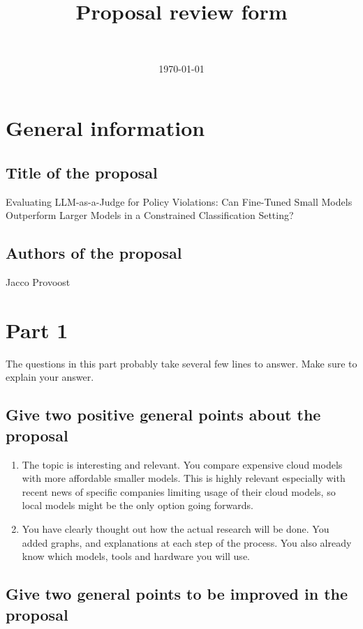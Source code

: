 \documentclass{article}
\title{Proposal review form }
\author{~} %
\date{\today}
\begin{document}
\maketitle

\section*{General information}


\subsection*{Title of the proposal}

Evaluating LLM-as-a-Judge for Policy Violations: Can Fine-Tuned Small Models Outperform Larger Models in a Constrained Classification Setting?

\subsection*{Authors of the proposal}

Jacco Provoost

\section{Part 1}

The questions in this part probably take several few lines to answer. Make sure to explain your answer.

\subsection{Give two positive general points about the proposal}

\begin{enumerate}
	\item The topic is interesting and relevant. You compare expensive cloud models with more affordable smaller models. This is highly relevant especially with recent news of specific companies limiting usage of their cloud models, so local models might be the only option going forwards.
	\item You have clearly thought out how the actual research will be done. You added graphs, and explanations at each step of the process. You also already know which models, tools and hardware you will use.
\end{enumerate}


\subsection{Give two general points to be improved in the proposal}
\end{document}
